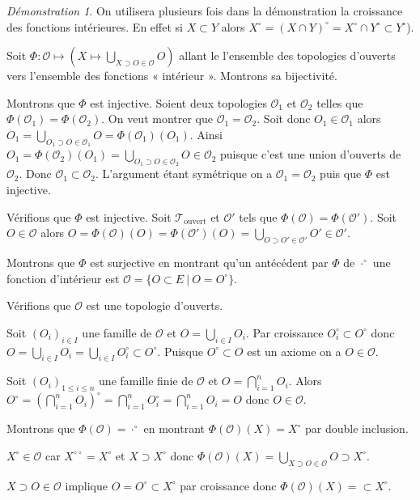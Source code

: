 \documentclass[a4paper, 11pt, french]{book}
\newenvironment{itemise}{\itemize}{\enditemize}
\theoremstyle{plain} %
\theoremstyle{definition} %
\theoremstyle{remark} %
\newtheorem*{demonstration}{Démonstration}
\newcommand{\1}{\mathds{1}}
\newcommand{\scr}[1]{\mathscr{#1}}
\newcommand{\rm}[1]{\mathrm{#1}}
\newcommand\ens[2]{\{#1 \ |\ #2\}}
\begin{document}
\begin{demonstration}
	On utilisera plusieurs fois dans la démonstration la croissance des fonctions intérieures.
	En effet si $X\subset Y$ alors $X^\circ=(X\cap Y)^\circ=X^\circ\cap Y^\circ\subset Y^\circ$).

	Soit $\Phi\colon\scr{O}\mapsto(X\mapsto\bigcup_{X\supset O\in\scr{O}}O)$ allant le l'ensemble des topologies d'ouverts vers l'ensemble des fonctions « intérieur ».
	Montrons sa bijectivité.
	\begin{itemise}
		\item Montrons que $\Phi$ est injective.
		Soient deux topologies $\scr{O}_1$ et $\scr{O}_2$ telles que $\Phi(\scr{O}_1)=\Phi(\scr{O}_2)$.
		On veut montrer que $\scr{O}_1=\scr{O}_2$.
		Soit donc $O_1\in\scr{O}_1$ alors $O_1=\bigcup_{O_1\supset O\in\scr{O}_1}O=\Phi(\scr{O}_1)(O_1)$.
		Ainsi $O_1=\Phi(\scr{O}_2)(O_1)=\bigcup_{O_1\supset O\in\scr{O}_2}O\in\scr{O}_2$ puisque c'est une union d'ouverts de $\scr{O}_2$.
		Donc $\scr{O}_1\subset\scr{O}_2$.
		L'argument étant symétrique on a $\scr{O}_1=\scr{O}_2$ puis que $\Phi$ est injective.
		\item Vérifions que $\Phi$ est injective.
		Soit $\scr{T_\rm{ouvert}}$ et $\scr{O}'$ tels que $\Phi(\scr{O})=\Phi(\scr{O}')$.
		Soit $O\in\scr{O}$ alors $O=\Phi(\scr{O})(O)=\Phi(\scr{O}')(O)=\bigcup_{O\supset O'\in\scr{O}'}O'\in\scr{O}'$.
		\item Montrons que $\Phi$ est surjective en montrant qu'un antécédent par $\Phi$ de $\cdot^\circ$ une fonction d'intérieur est $\scr{O}=\ens{O\subset E}{O=O^\circ}$.
		\begin{itemise}
			\item Vérifions que $\scr{O}$ est une topologie d'ouverts.
			\begin{itemise}
				\item Soit $(O_i)_{i\in I}$ une famille de $\scr{O}$ et $O=\bigcup_{i\in I}O_i$.
				Par croissance $O_i^\circ\subset O^\circ$ donc $O=\bigcup_{i\in I}O_i=\bigcup_{i\in I}O_i^\circ\subset O^\circ$.
				Puisque $O^\circ\subset O$ est un axiome on a $O\in\scr{O}$.
				\item Soit $(O_i)_{1\leqslant i\leqslant n}$ une famille finie de $\scr{O}$ et $O=\bigcap_{i=1}^nO_i$.
				Alors $O^\circ=(\bigcap_{i=1}^nO_i)^\circ=\bigcap_{i=1}^nO_i^\circ=\bigcap_{i=1}^nO_i=O$ donc $O\in\scr{O}$.
			\end{itemise}
			\item Montrons que $\Phi(\scr{O})=\cdot^\circ$ en montrant $\Phi(\scr{O})(X)=X^\circ$ par double inclusion.
			\begin{itemise}
				\item $X^\circ\in\scr{O}$ car $X^{\circ\circ}=X^\circ$ et $X\supset X^\circ$ donc $\Phi(\scr{O})(X)=\bigcup_{X\supset O\in\scr{O}}O\supset X^\circ$.
				\item $X\supset O\in\scr{O}$ implique $O=O^\circ\subset X^\circ$ par croissance donc $\Phi(\scr{O})(X)=\subset X^\circ$.
			\end{itemise}
		\end{itemise}
	\end{itemise}
\end{demonstration}
\end{document}
